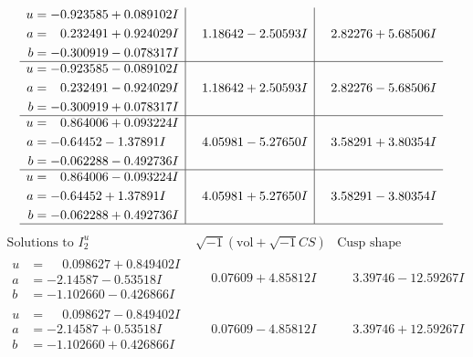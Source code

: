 \documentclass[1p]{elsarticle_modified}
\theoremstyle{definition}
\newcommand{\I}{\sqrt{-1}}
\begin{document}
$$\begin{array}{c|c|c}
\begin{aligned}
u &= -0.923585 + 0.089102 I \\
a &= \phantom{-}0.232491 + 0.924029 I \\
b &= -0.300919 - 0.078317 I\end{aligned}
 & \phantom{-}1.18642 - 2.50593 I & \phantom{-}2.82276 + 5.68506 I \\ \hline\begin{aligned}
u &= -0.923585 - 0.089102 I \\
a &= \phantom{-}0.232491 - 0.924029 I \\
b &= -0.300919 + 0.078317 I\end{aligned}
 & \phantom{-}1.18642 + 2.50593 I & \phantom{-}2.82276 - 5.68506 I \\ \hline\begin{aligned}
u &= \phantom{-}0.864006 + 0.093224 I \\
a &= -0.64452 - 1.37891 I \\
b &= -0.062288 - 0.492736 I\end{aligned}
 & \phantom{-}4.05981 - 5.27650 I & \phantom{-}3.58291 + 3.80354 I \\ \hline\begin{aligned}
u &= \phantom{-}0.864006 - 0.093224 I \\
a &= -0.64452 + 1.37891 I \\
b &= -0.062288 + 0.492736 I\end{aligned}
 & \phantom{-}4.05981 + 5.27650 I & \phantom{-}3.58291 - 3.80354 I\\
 \hline 
 \end{array}$$\newpage$$\begin{array}{c|c|c}  
\text{Solutions to }I^u_{2}& \I (\text{vol} + \sqrt{-1}CS) & \text{Cusp shape}\\
 \hline 
\begin{aligned}
u &= \phantom{-}0.098627 + 0.849402 I \\
a &= -2.14587 - 0.53518 I \\
b &= -1.102660 - 0.426866 I\end{aligned}
 & \phantom{-}0.07609 + 4.85812 I & \phantom{-}3.39746 - 12.59267 I \\ \hline\begin{aligned}
u &= \phantom{-}0.098627 - 0.849402 I \\
a &= -2.14587 + 0.53518 I \\
b &= -1.102660 + 0.426866 I\end{aligned}
 & \phantom{-}0.07609 - 4.85812 I & \phantom{-}3.39746 + 12.59267 I \\ \hline\begin{aligned}

\end{aligned}
\end{array}$$
\end{document}

